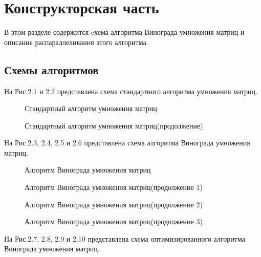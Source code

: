 \documentclass[a4paper,12pt]{report}
\begin{document}
\chapter{Конструкторская часть}
\hspace{0.6cm}В этом разделе содержится cхема алгоритма Винограда умножения матриц и описание распараллеливания этого алгоритма.
\newpage
\section{Схемы алгоритмов}

\hspace{0.6cm}На Рис.2.1 и 2.2 представлена схема стандартного алгоритма умножения матриц.
\begin{figure}[ht!]
\caption{Стандартный алгоритм умножения матриц}
\newpage
\end{figure}
\newpage
\begin{figure}[ht!]
\caption{Стандартный алгоритм умножения матриц(продолжение)}
\end{figure}
\newpage
На Рис.2.3, 2.4, 2.5 и 2.6 представлена схема алгоритма Винограда умножения матриц.
\begin{figure}[ht!]
\caption{Алгоритм Винограда умножения матриц}
\end{figure}
\newpage
\begin{figure}[ht!]
\caption{Алгоритм Винограда умножения матриц(продолжение 1)}
\end{figure}
\newpage
\begin{figure}[ht!]
\caption{Алгоритм Винограда умножения матриц(продолжение 2)}
\end{figure}
\newpage
\begin{figure}[ht!]
\caption{Алгоритм Винограда умножения матриц(продолжение 3)}
\end{figure}
\newpage

На Рис.2.7, 2.8, 2.9 и 2.10 представлена схема оптимизированного алгоритма Винограда умножения матриц.
\end{document}
